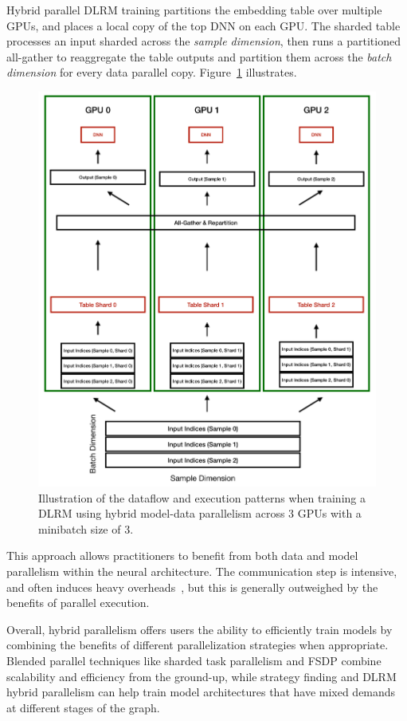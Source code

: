 Hybrid parallel DLRM training partitions the embedding table over multiple GPUs, and places a local copy of the top DNN on each GPU. The sharded table processes an input sharded across the \textit{sample dimension}, then runs a partitioned all-gather to reaggregate the table outputs and partition them across the \textit{batch dimension} for every data parallel copy. Figure~\ref{fig:mp_dp_parallel} illustrates.

\begin{figure}[th!]
\centering
	\includegraphics[keepaspectratio=true, width=\linewidth]{images/hybrid_parallel_embedding}
	\caption{Illustration of the dataflow and execution patterns when training a DLRM using hybrid model-data parallelism across 3 GPUs with a minibatch size of 3.}
	\label{fig:mp_dp_parallel}
\end{figure}

This approach allows practitioners to benefit from both data and model parallelism within the neural architecture. The communication step is intensive, and often induces heavy overheads~\cite{mlplatformmeetup2022}, but this is generally outweighed by the benefits of parallel execution.

Overall, hybrid parallelism offers users the ability to efficiently train models by combining the benefits of different parallelization strategies when appropriate. Blended parallel techniques like sharded task parallelism and FSDP combine scalability and efficiency from the ground-up, while strategy finding and DLRM hybrid parallelism can help train model architectures that have mixed demands at different stages of the graph.


